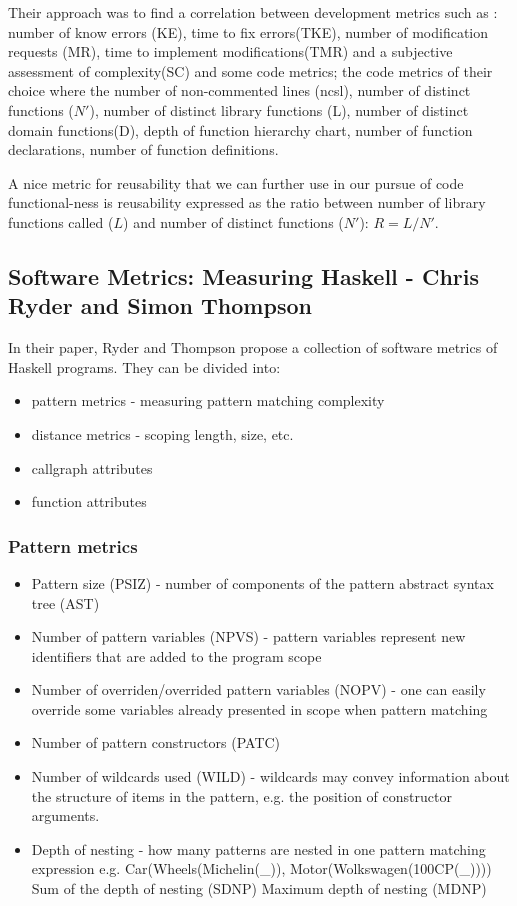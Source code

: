 \documentclass{article}
\begin{document}
Their approach was to find a correlation between development metrics such as : number of know errors (KE), time to fix errors(TKE), number of modification requests (MR), time to implement modifications(TMR) and a subjective assessment of complexity(SC) and some code metrics; the code metrics of their choice where the number of non-commented lines (ncsl), number of distinct functions ($N'$), number of distinct library functions (L), number of distinct domain functions(D), depth of function hierarchy chart, number of function declarations, number of function definitions. \par

A nice metric for reusability that we can further use in our pursue of code functional-ness is reusability expressed as the ratio between number of library functions called ($L$) and number of distinct functions ($N'$): $R = L / N'$. \par

\subsection{Software Metrics: Measuring Haskell - Chris Ryder and Simon Thompson}
In their paper, Ryder and Thompson propose a collection of software metrics of Haskell programs. They can be divided into:
\begin{itemize}
\item pattern metrics - measuring pattern matching complexity
\item distance metrics - scoping length, size, etc.
\item callgraph attributes 
\item function attributes
\end{itemize}

\subsubsection{Pattern metrics}
\begin{itemize}
\item Pattern size (PSIZ) - number of components of the pattern abstract syntax tree (AST)
\item Number of pattern variables (NPVS) - pattern variables represent new identifiers that are added to the program scope
\item Number of overriden/overrided pattern variables (NOPV) - one can easily override some variables already presented in scope when pattern matching
\item Number of pattern constructors (PATC) 
\item Number of wildcards used (WILD) -  wildcards may convey information about the structure of items in the pattern, e.g. the position of constructor arguments.
\item Depth of nesting - how many patterns are nested in one pattern matching expression e.g. Car(Wheels(Michelin(\_)), Motor(Wolkswagen(100CP(\_))))
\subitem Sum of the depth of nesting (SDNP)
\subitem Maximum depth of nesting (MDNP)
\end{itemize}
\end{document}
